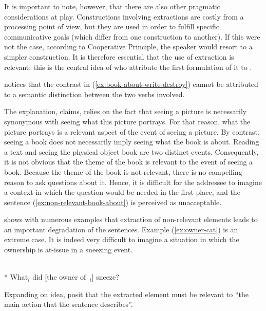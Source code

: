 \label{ch:discourse-relevance}

It is important to note, however, that there are also other pragmatic considerations at play. Constructions involving extractions are costly from a processing point of view, but they are used in order to fulfill specific communicative goals (which differ from one construction to another). If this were not the case, according to  Cooperative Principle, the speaker would resort to a simpler construction. It is therefore essential that the use of extraction is relevant: this is the central idea of \citet{Chaves.2020.UDC} who attribute the first formulation of it to \citet{Kuno.1987}. 

\citeauthor{Kuno.1987} notices that the contrast in (\ref{ex:book-about-write-destroy}) cannot be attributed to a semantic distinction between the two verbs involved.

\begin{exe}
\ex \citep[23]{Kuno.1987}
\begin{xlist}
\label{ex:non-relevant-book-about}
\end{xlist}
\end{exe}

The explanation, \citeauthor{Kuno.1972} claims, relies on the fact that seeing a picture is necessarily synonymous with seeing what this picture portrays. For that reason, what the picture portrays is a relevant aspect of the event of seeing a picture. By contrast, seeing a book does not necessarily imply seeing what the book is about. Reading a text and seeing the physical object book are two distinct events. Consequently, it is not obvious that the theme of the book is relevant to the event of seeing a book. Because the theme of the book is not relevant, there is no compelling reason to ask questions about it. Hence, it is difficult for the addressee to imagine a context in which the question would be needed in the first place, and the sentence (\ref{ex:non-relevant-book-about}) is perceived as unacceptable. 

\citet{Chaves.2013} shows with numerous examples that extraction of non-relevant elements leads to an important degradation of the sentences. Example (\ref{ex:owner-cat}) is an extreme case. It is indeed very difficult to imagine a situation in which the ownership is at-issue in a sneezing event.

\ea \citep[12]{Chaves.2013}\\
* What$_i$ did [the owner of~\trace{}$_i$] sneeze?
\label{ex:owner-cat}
\z 


Expanding on  idea, \citet[327]{Chaves.2020.UDC} posit that the extracted element must be relevant to ``the main action that the sentence describes''. 